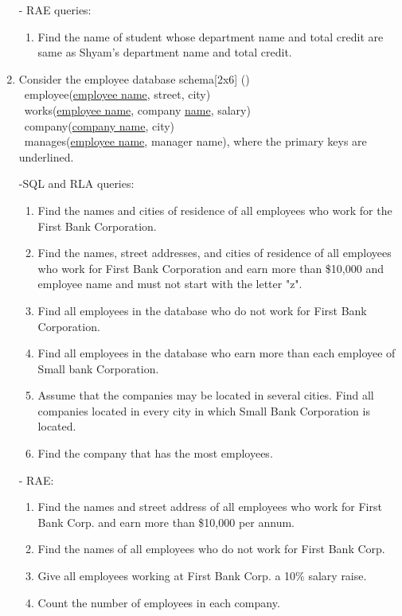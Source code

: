 \documentclass[12pt]{article}
\newcommand{\enter}{\\\textcolor{white}{1}}
\begin{document}
\begin{enumerate}
        - RAE queries: 
        \begin{enumerate}[noitemsep, topsep = 0pt, label = \alph*.]
            \item Find the name of student whose department name and total credit are same as Shyam's department name and total credit.
        \end{enumerate}


    \item Consider the employee database schema\hfill[2x6] ()
        \enter employee(\underline{employee name}, street, city)
        \enter works(\underline{employee name}, company \underline{name}, salary)
        \enter company(\underline{company name}, city)
        \enter manages(\underline{employee name}, manager name), where the primary keys are underlined.

        -SQL and RLA queries: 
        \begin{enumerate}[noitemsep, topsep = 0pt, label = \alph*.]
                \item Find the names and cities of residence of all employees who work for the First Bank Corporation. 
                \item Find the names, street addresses, and cities of residence of all employees who work for First Bank Corporation and earn more than \$10,000 and employee name and must not start with the letter "z".
                \item Find all employees in the database who do not work for First Bank Corporation.
                \item Find all employees in the database who earn more than each employee of Small bank Corporation.
                \item Assume that the companies may be located in several cities. Find all companies located in every city in which Small Bank Corporation is located.
                \item Find the company that has the most employees.
        \end{enumerate}

            - RAE:
            \begin{enumerate}[noitemsep, topsep = 0pt, label = \alph*.]
                \item Find the names and street address of all employees who work for First Bank Corp. and earn more than \$10,000 per annum.
                \item Find the names of all employees who do not work for First Bank Corp.
                \item Give all employees working at First Bank Corp. a 10\% salary raise.
                \item Count the number of employees in each company.
            \end{enumerate}


\end{enumerate}
\end{document}
